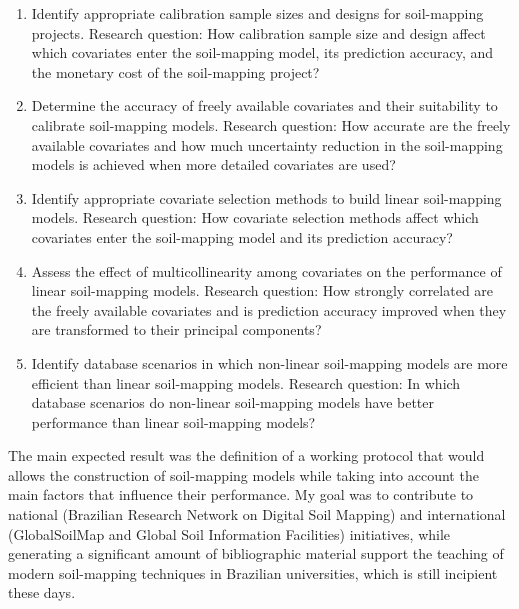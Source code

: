 \begin{enumerate}
\item Identify appropriate calibration sample sizes and designs for soil-mapping projects.\newline
Research question: How calibration sample size and design affect which covariates enter the 
soil-mapping model, its prediction accuracy, and the monetary cost of the soil-mapping project?

\item Determine the accuracy of freely available covariates and their suitability to calibrate 
soil-mapping models.\newline
Research question: How accurate are the freely available covariates and how much uncertainty 
reduction in the soil-mapping models is achieved when more detailed covariates are used?

\item Identify appropriate covariate selection methods to build linear soil-mapping models.\newline
Research question: How covariate selection methods affect which covariates enter the soil-mapping 
model and its prediction accuracy?

\item Assess the effect of multicollinearity among covariates on the performance of linear 
soil-mapping models.\newline
Research question: How strongly correlated are the freely available covariates and is prediction 
accuracy improved when they are transformed to their principal components?

\item Identify database scenarios in which non-linear soil-mapping models are more efficient than 
linear soil-mapping models.\newline
Research question: In which database scenarios do non-linear soil-mapping models have better 
performance than linear soil-mapping models?
\end{enumerate}

The main expected result was the definition of a working protocol that would allows the construction
of soil-mapping models while taking into account the main factors that influence their performance. 
My goal was to contribute to national (Brazilian Research Network on Digital Soil Mapping) and 
international (GlobalSoilMap and Global Soil Information Facilities) initiatives, while generating a
significant amount of bibliographic material support the teaching of modern soil-mapping techniques 
in Brazilian universities, which is still incipient these days.

